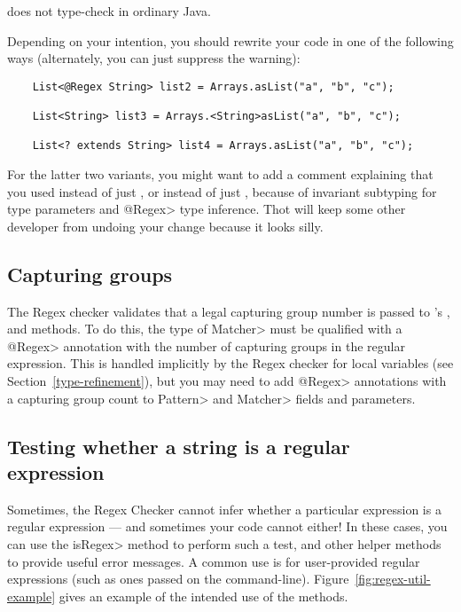 \noindent
does not type-check in ordinary Java.

Depending on your intention, you should rewrite your code in one of the
following ways (alternately, you can just suppress the warning):

\begin{Verbatim}
    List<@Regex String> list2 = Arrays.asList("a", "b", "c");

    List<String> list3 = Arrays.<String>asList("a", "b", "c");

    List<? extends String> list4 = Arrays.asList("a", "b", "c");
\end{Verbatim}

\noindent
For the latter two variants, you might want to add a comment explaining
that you used  instead of just , or
 instead of just , because
of invariant subtyping for type parameters and \<@Regex> type inference.
Thot will keep some other developer from undoing your change because it
looks silly.


\subsection{Capturing groups\label{regex-capturing-groups}}

The Regex checker validates that a legal capturing group number is passed
to 's
,
 and
 methods. To do this,
the type of \<Matcher> must be qualified with a \<@Regex> annotation
with the number of capturing groups in the regular expression. This is
handled implicitly by the Regex checker for local variables (see
Section~\ref{type-refinement}), but you may need to add \<@Regex> annotations
with a capturing group count to \<Pattern> and \<Matcher> fields and
parameters.

\subsection{Testing whether a string is a regular expression\label{regexutil-methods}}

Sometimes, the Regex Checker cannot infer whether a particular expression
is a regular expression --- and sometimes your code cannot either!  In
these cases, you can use the \<isRegex> method to perform such a test, and
other helper methods to provide useful error messages.  A
common use is for user-provided regular expressions (such as ones passed
on the command-line).
Figure~\ref{fig:regex-util-example} gives an
example of the intended use of the  methods.

